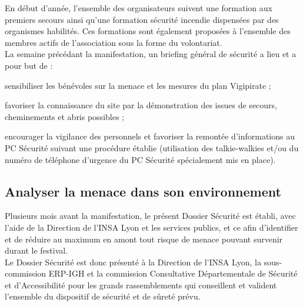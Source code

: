 \documentclass[hidelinks, paper=a4, fontsize=13pt]{report}
\begin{document}
En début d'année, l'ensemble des organisateurs suivent une formation aux premiers secours ainsi qu'une formation sécurité incendie dispensées par des organismes habilités. Ces formations sont également proposées à l'ensemble des membres actifs de l'association sous la forme du volontariat.\\

La semaine précédant la manifestation, un briefing général de sécurité a lieu et a pour but de :
\begin{list}{•}{}
	\item sensibiliser les bénévoles sur la menace et les mesures du plan Vigipirate ;
	\item favoriser la connaissance du site par la démonstration des issues de secours, cheminements et abris possibles ;
	\item encourager la vigilance des personnels et favoriser la remontée d’informations au PC Sécurité suivant une procédure établie (utilisation des talkie-walkies et/ou du numéro de téléphone d’urgence du PC Sécurité spécialement mis en place).
\end{list}

\subsection{Analyser la menace dans son environnement}

Plusieurs mois avant la manifestation, le présent Dossier Sécurité est établi, avec l'aide de la Direction de l'INSA Lyon et les services publics, et ce afin d'identifier et de réduire au maximum en amont tout risque de menace pouvant survenir durant le festival.\\

Le Dossier Sécurité est donc présenté à la Direction de l'INSA Lyon, la sous-commission ERP-IGH et la commission Consultative Départementale de Sécurité et d'Accessibilité pour les grands rassemblements qui conseillent et valident l'ensemble du dispositif de sécurité et de sûreté prévu.\\
\end{document}
